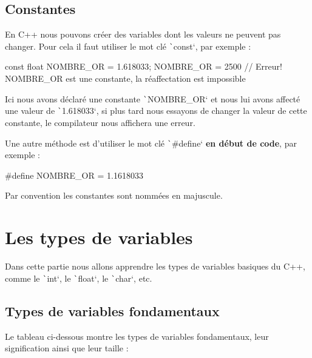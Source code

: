 \documentclass[10pt]{article}
\begin{document}
\subsection{Constantes}
En C++ nous pouvons créer des variables dont les valeurs ne peuvent pas changer. Pour cela il faut utiliser le mot clé \texttt`const`, par exemple :

\begin{cppcode}
    const float NOMBRE_OR = 1.618033;
    NOMBRE_OR = 2500 // Erreur! NOMBRE_OR est une constante, la réaffectation est impossible
\end{cppcode}

\bigskip
Ici nous avons déclaré une constante \texttt`NOMBRE_OR` et nous lui avons affecté une valeur de \texttt`1.618033`, si plus tard nous essayons de changer la valeur de cette constante, le compilateur nous affichera une erreur.

\smallskip
Une autre méthode est d'utiliser le mot clé \texttt`#define` \textbf{en début de code}, par exemple :

\begin{cppcode}
    #define NOMBRE_OR = 1.1618033
\end{cppcode}

\begin{noteblock}
    Par convention les constantes sont nommées en majuscule.
\end{noteblock}




\section{Les types de variables}
Dans cette partie nous allons apprendre les types de variables basiques du C++, comme le \texttt`int`, le \texttt`float`, le \texttt`char`, etc.

\subsection{Types de variables fondamentaux}
Le tableau ci-dessous montre les types de variables fondamentaux, leur signification ainsi que leur taille :
\end{document}
